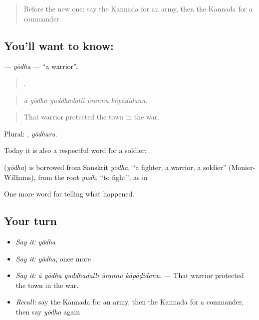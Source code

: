 \label{lesson:KA-C336-yodha}



\begin{quote}
Before the new one: say the Kannada for an army, then the Kannada for a commander.
\end{quote}

\subsection*{You'll want to know: }
\textbf{} — \emph{yōdha} — \textquotedblleft{}a warrior\textquotedblright{}.

\begin{quote}
    .
\end{quote}

\begin{quote}
\emph{ā yōdha yuddhadalli ūrannu kāpāḍidanu.}
\end{quote}

\begin{quote}
That warrior protected the town in the war.
\end{quote}

Plural: , \emph{yōdharu}.

Today it is also a respectful word for a soldier:  .

\begin{cousinweb}
\textbf{} (\emph{yōdha}) is borrowed from Sanskrit \emph{yodha}, \textquotedblleft{}a fighter, a warrior, a soldier\textquotedblright{} (Monier-Williams), from the root \emph{yudh}, \textquotedblleft{}to fight\textquotedblright{}, as in .
\end{cousinweb}

\begin{grammarlens}[title={What you've built}]
One more word for telling what happened.
\end{grammarlens}

\subsection*{Your turn}
\begin{itemize}
\raggedright
  \item \emph{Say it:} \emph{yōdha}
  \item \emph{Say it:} \emph{yōdha}, once more
  \item \emph{Say it:} \emph{ā yōdha yuddhadalli ūrannu kāpāḍidanu.} — That warrior protected the town in the war.
  \item \emph{Recall:} say the Kannada for an army, then the Kannada for a commander, then say \emph{yōdha} again
\end{itemize}

